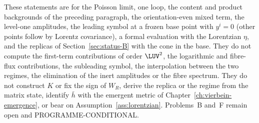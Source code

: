 These statements are for the Poisson limit, one loop, the content and product backgrounds of the preceding paragraph, the orientation-even mixed term, the level-one amplitudes, the leading symbol at a frozen base point with \(y^i=0\) (other points follow by Lorentz covariance), a formal evaluation with the Lorentzian \(\eta\), and the replicas of Section~\ref{sec:status-B} with the cone in the base. They do not compute the first-term contributions of order \(\LUV^2\), the logarithmic and fibre-flux contributions, the subleading symbol, the interpolation between the two regimes, the elimination of the inert amplitudes or the fibre spectrum. They do not construct \(K\) or fix the sign of \(W_R\), derive the replica or the regime from the matrix state, identify \(\bar h\) with the emergent metric of Chapter~\ref{ch:vierbein-emergence}, or bear on Assumption~\ref{ass:lorentzian}. Problems~B and~F remain open and PROGRAMME-CONDITIONAL.
